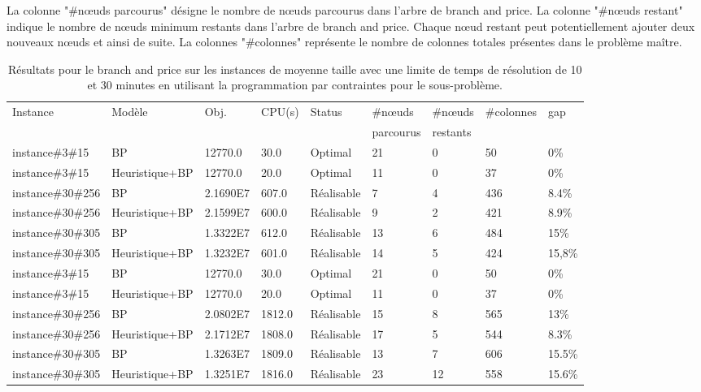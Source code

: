 La colonne "\#n\oe uds parcourus" désigne le nombre de n\oe uds parcourus dans l'arbre de branch and price.
La colonne "\#n\oe uds restant" indique le nombre de n\oe uds minimum restants dans l'arbre de branch and price.
Chaque n\oe ud restant peut potentiellement ajouter deux nouveaux n\oe uds et ainsi de suite.
La colonnes "\#colonnes" représente le nombre de colonnes totales présentes dans le problème maître.

 \begin{table}
[H]
\centering
\scriptsize
 \begin{tabular}
 {|l|l|l|l|l|l|l|l|l|}
 \hline
 Instance & Modèle & Obj. & CPU(s) & Status & \#n\oe uds & \#n\oe uds & \#colonnes & gap\\
 & & & & & parcourus & restants & & \\
 \hline
instance\#3\#15 & BP & 12770.0 & 30.0 & Optimal & 21 & 0 & 50 & 0\%\\
instance\#3\#15 & Heuristique+BP & 12770.0	& 20.0 & Optimal & 11 & 0 & 37 & 0\%\\
instance\#30\#256 & BP & 2.1690E7 & 607.0 & Réalisable & 7 & 4 & 436 & 8.4\%\\
instance\#30\#256 & Heuristique+BP & 2.1599E7 & 600.0 & Réalisable & 9 & 2 & 421 & 8.9\%\\
instance\#30\#305 & BP & 1.3322E7 & 612.0 & Réalisable & 13 & 6 & 484 & 15\%\\
instance\#30\#305 & Heuristique+BP & 1.3232E7 & 601.0 & Réalisable & 14 & 5 & 424 & 15,8\% \\ 
 \hline
instance\#3\#15 & BP & 12770.0 & 30.0 & Optimal & 21 & 0 & 50 & 0\%\\
instance\#3\#15 & Heuristique+BP & 12770.0	& 20.0 & Optimal & 11 & 0 & 37 & 0\%\\
instance\#30\#256 & BP & 2.0802E7 & 1812.0 & Réalisable & 15 & 8 & 565 & 13\%\\
instance\#30\#256 & Heuristique+BP & 2.1712E7 & 1808.0 & Réalisable & 17 & 5 & 544 & 8.3\%\\
instance\#30\#305 & BP & 1.3263E7 & 1809.0 & Réalisable & 13 & 7 & 606 & 15.5\%\\
instance\#30\#305 & Heuristique+BP & 1.3251E7 & 1816.0 & Réalisable & 23 & 12 & 558 & 15.6\%\\
 \hline
 \end{tabular}
 \caption{Résultats pour le branch and price sur les instances de moyenne taille avec une limite de temps de résolution de 10 et 30 minutes en utilisant la programmation par contraintes pour le sous-problème.\label{table:res_BP_CP}}
\end{table}


